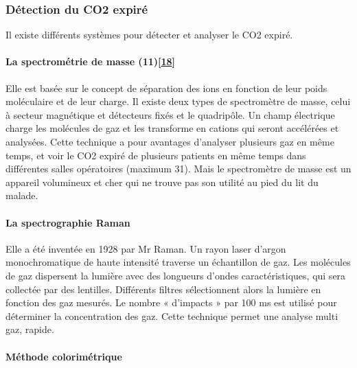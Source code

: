 \documentclass[12pt,]{article}
\let\oldparagraph\paragraph
\renewcommand{\paragraph}[1]{\oldparagraph{#1}\mbox{}}
\begin{document}
\hypertarget{duxe9tection-du-co2-expiruxe9}{%
\subsubsection{Détection du CO2
expiré}\label{duxe9tection-du-co2-expiruxe9}}

Il existe différents systèmes pour détecter et analyser le CO2 expiré.

\hypertarget{la-spectromuxe9trie-de-masse-11bhavani1992capnometry}{%
\paragraph{\texorpdfstring{La spectrométrie de masse
(11){[}\protect\hyperlink{ref-bhavani1992capnometry}{18}{]}}{La spectrométrie de masse (11){[}18{]}}}\label{la-spectromuxe9trie-de-masse-11bhavani1992capnometry}}

Elle est basée sur le concept de séparation des ions en fonction de leur
poids moléculaire et de leur charge. Il existe deux types de
spectromètre de masse, celui à secteur magnétique et détecteurs fixés et
le quadripôle. Un champ électrique charge les molécules de gaz et les
transforme en cations qui seront accélérées et analysées. Cette
technique a pour avantages d'analyser plusieurs gaz en même temps, et
voir le CO2 expiré de plusieurs patients en même temps dans différentes
salles opératoires (maximum 31). Mais le spectromètre de masse est un
appareil volumineux et cher qui ne trouve pas son utilité au pied du lit
du malade.

\hypertarget{la-spectrographie-raman}{%
\paragraph{La spectrographie Raman}\label{la-spectrographie-raman}}

Elle a été inventée en 1928 par Mr Raman. Un rayon laser d'argon
monochromatique de haute intensité traverse un échantillon de gaz. Les
molécules de gaz dispersent la lumière avec des longueurs d'ondes
caractéristiques, qui sera collectée par des lentilles. Différents
filtres sélectionnent alors la lumière en fonction des gaz mesurés. Le
nombre « d'impacts » par 100 ms est utilisé pour déterminer la
concentration des gaz. Cette technique permet une analyse multi gaz,
rapide.

\hypertarget{muxe9thode-colorimuxe9trique}{%
\paragraph{Méthode colorimétrique}\label{muxe9thode-colorimuxe9trique}}
\end{document}
